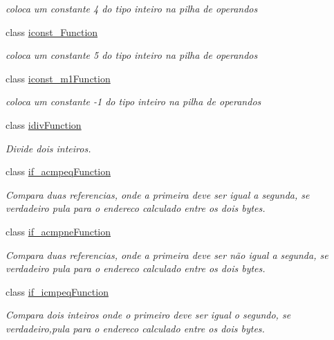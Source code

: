 \begin{DoxyCompactItemize}
\begin{DoxyCompactList}\small\item\em coloca um constante 4 do tipo inteiro na pilha de operandos \end{DoxyCompactList}\item 
class \hyperlink{classInstruction_1_1iconst__5Function}{iconst\+\_\+Function}
\begin{DoxyCompactList}\small\item\em coloca um constante 5 do tipo inteiro na pilha de operandos \end{DoxyCompactList}\item 
class \hyperlink{classInstruction_1_1iconst__m1Function}{iconst\+\_\+m1\+Function}
\begin{DoxyCompactList}\small\item\em coloca um constante -\/1 do tipo inteiro na pilha de operandos \end{DoxyCompactList}\item 
class \hyperlink{classInstruction_1_1idivFunction}{idiv\+Function}
\begin{DoxyCompactList}\small\item\em Divide dois inteiros. \end{DoxyCompactList}\item 
class \hyperlink{classInstruction_1_1if__acmpeqFunction}{if\+\_\+acmpeq\+Function}
\begin{DoxyCompactList}\small\item\em Compara duas referencias, onde a primeira deve ser igual a segunda, se verdadeiro pula para o endereco calculado entre os dois bytes. \end{DoxyCompactList}\item 
class \hyperlink{classInstruction_1_1if__acmpneFunction}{if\+\_\+acmpne\+Function}
\begin{DoxyCompactList}\small\item\em Compara duas referencias, onde a primeira deve ser não igual a segunda, se verdadeiro pula para o endereco calculado entre os dois bytes. \end{DoxyCompactList}\item 
class \hyperlink{classInstruction_1_1if__icmpeqFunction}{if\+\_\+icmpeq\+Function}
\begin{DoxyCompactList}\small\item\em Compara dois inteiros onde o primeiro deve ser igual o segundo, se verdadeiro,pula para o endereco calculado entre os dois bytes. \end{DoxyCompactList}\item 

\end{DoxyCompactItemize}
